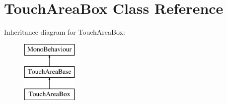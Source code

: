 \hypertarget{class_touch_area_box}{}\section{Touch\+Area\+Box Class Reference}
\label{class_touch_area_box}
Inheritance diagram for Touch\+Area\+Box\+:\begin{figure}[H]
\begin{center}
\leavevmode
\includegraphics[height=3.000000cm]{class_touch_area_box}
\end{center}
\end{figure}
